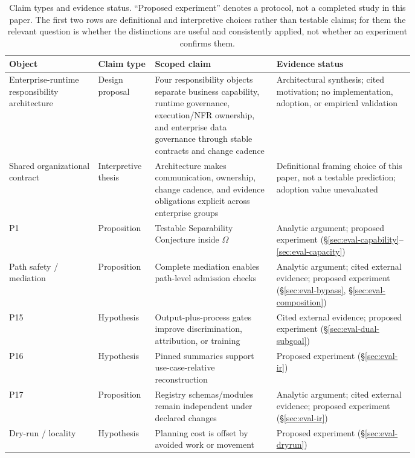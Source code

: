 \begin{table}[t]
\centering
\caption{Claim types and evidence status. ``Proposed experiment'' denotes a protocol, not a completed study in this paper. The first two rows are definitional and interpretive choices rather than testable claims; for them the relevant question is whether the distinctions are useful and consistently applied, not whether an experiment confirms them.}
\label{tab:propositions}
\begin{tabular}{lp{0.14\linewidth}p{0.30\linewidth}p{0.34\linewidth}}
\hline
Object & Claim type & Scoped claim & Evidence status \\
\hline
Enterprise-runtime responsibility architecture & Design proposal & Four responsibility objects separate business capability, runtime governance, execution/NFR ownership, and enterprise data governance through stable contracts and change cadence & Architectural synthesis; cited motivation; no implementation, adoption, or empirical validation \\
Shared organizational contract & Interpretive thesis & Architecture makes communication, ownership, change cadence, and evidence obligations explicit across enterprise groups & Definitional framing choice of this paper, not a testable prediction; adoption value unevaluated \\
P1 & Proposition & Testable Separability Conjecture inside $\Omega$ & Analytic argument; proposed experiment (\S\ref{sec:eval-capability}--\ref{sec:eval-capacity}) \\
Path safety / mediation & Proposition & Complete mediation enables path-level admission checks & Analytic argument; cited external evidence; proposed experiment (\S\ref{sec:eval-bypass}, \S\ref{sec:eval-composition}) \\
P15 & Hypothesis & Output-plus-process gates improve discrimination, attribution, or training & Cited external evidence; proposed experiment (\S\ref{sec:eval-dual-subgoal}) \\
P16 & Hypothesis & Pinned summaries support use-case-relative reconstruction & Proposed experiment (\S\ref{sec:eval-ir}) \\
P17 & Proposition & Registry schemas/modules remain independent under declared changes & Analytic argument; cited external evidence; proposed experiment (\S\ref{sec:eval-ir}) \\
Dry-run / locality & Hypothesis & Planning cost is offset by avoided work or movement & Proposed experiment (\S\ref{sec:eval-dryrun}) \\

\end{tabular}
\end{table}
